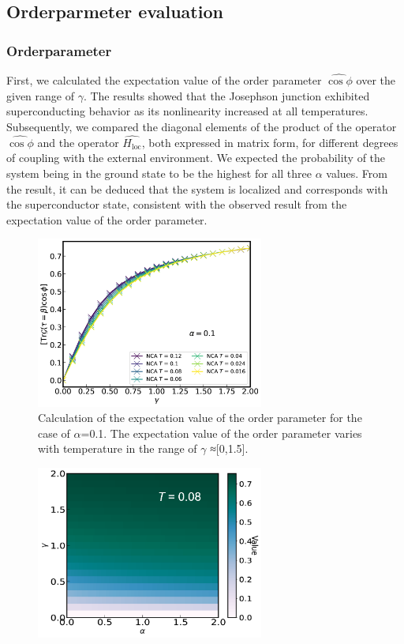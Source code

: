 \documentclass{article}[12pt]
\begin{document}
\begin{spacing}{1.5}
\subsection{Orderparmeter evaluation}
\subsubsection*{Orderparameter}
First, we calculated the expectation value of the order parameter $\hat{\cos\phi}$ 
over the given range of $\gamma$. The results showed that the Josephson junction exhibited superconducting behavior 
as its nonlinearity increased at all temperatures. Subsequently, we compared the diagonal elements of the product 
of the operator $\hat{\cos\phi}$ and the operator $\hat{H_{\text{loc}}}$, both expressed in matrix form, 
for different degrees of coupling with the external environment. We expected the probability of the system 
being in the ground state to be the highest for all three $\alpha$ values. From the result, 
it can be deduced that the system is localized and corresponds with the superconductor state, consistent with the observed
result from the expectation value of the order parameter.
\begin{figure}[htbp]
  \centerline{\includegraphics[width=7.5cm]{TexFigure/4_3_01_Expec_alp_0.1.png}}
  \caption{Calculation of the expectation value of the order parameter for the case of $\alpha$=0.1. 
  The expectation value of the order parameter varies with temperature in the range of $\gamma$ ≈[0,1.5].}
  \label{fig:Order1}
\end{figure}
\begin{figure}[htbp]
  \centerline{\includegraphics[width=7.5cm]{TexFigure/4_3_02_Temp.png}}

\end{figure}
\end{spacing}
\end{document}
